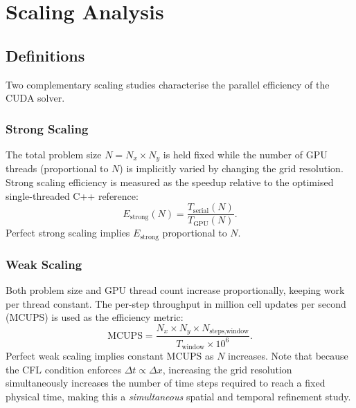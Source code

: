 \documentclass[10pt, conference]{FMFP2023}
\begin{document}
\section{Scaling Analysis}
\label{sec:scaling}

\subsection{Definitions}

Two complementary scaling studies characterise the parallel
efficiency of the CUDA solver.

\subsubsection{Strong Scaling}

The total problem size $N=N_x\times N_y$ is held fixed
while the number of GPU threads (proportional to $N$)
is implicitly varied by changing the grid resolution.
Strong scaling efficiency is measured as the speedup
relative to the optimised single-threaded C++ reference:
\begin{equation}
    E_{\text{strong}}(N)
    = \frac{T_{\text{serial}}(N)}{T_{\text{GPU}}(N)}.
    \label{eq:strong_eff}
\end{equation}
Perfect strong scaling implies $E_{\text{strong}}$
proportional to $N$.

\subsubsection{Weak Scaling}

Both problem size and GPU thread count increase
proportionally, keeping work per thread constant.
The per-step throughput in million cell updates per second
(MCUPS) is used as the efficiency metric:
\begin{equation}
    \text{MCUPS}
    = \frac{N_x \times N_y \times N_{\text{steps,window}}}
           {T_{\text{window}} \times 10^6}.
    \label{eq:mcups}
\end{equation}
Perfect weak scaling implies constant MCUPS as $N$
increases.
Note that because the CFL condition enforces
$\Delta t\propto\Delta x$, increasing the grid resolution
simultaneously increases the number of time steps required
to reach a fixed physical time, making this a
\emph{simultaneous} spatial and temporal refinement study.
\end{document}
